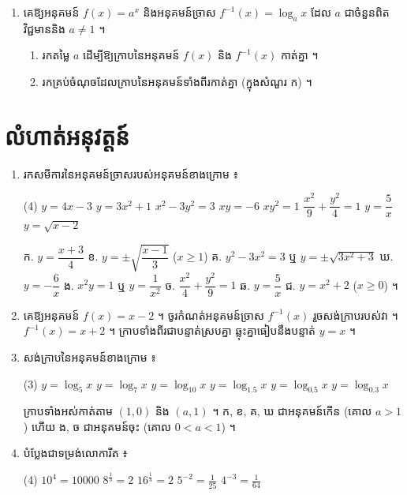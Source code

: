 \begin{enumerate}[1]
  \item គេឱ្យអនុគមន៍ $f(x) = a^x$ និងអនុគមន៍ច្រាស $f^{-1}(x) = \log_a x$ ដែល $a$ ជាចំនួនពិតវិជ្ជមាននិង $a \ne 1$ ។
  \begin{enumerate}[a]
    \item រកតម្លៃ $a$ ដើម្បីឱ្យក្រាបនៃអនុគមន៍ $f(x)$ និង $f^{-1}(x)$ កាត់គ្នា ។
    \item រកគ្រប់ចំណុចដែលក្រាបនៃអនុគមន៍ទាំងពីរកាត់គ្នា (ក្នុងសំណួរ ក) ។
  \end{enumerate}
\end{enumerate}

\section*{លំហាត់អនុវត្តន៍}
\begin{enumerate}[1]
  \item រកសមីការនៃអនុគមន៍ច្រាសរបស់អនុគមន៍ខាងក្រោម ៖
  \begin{tasks}(4)
    \task $y = 4x - 3$
    \task $y = 3x^2 + 1$
    \task $x^2 - 3y^2 = 3$
    \task $xy = -6$
    \task $xy^2 = 1$
    \task $\dfrac{x^2}{9} + \dfrac{y^2}{4} = 1$
    \task $y = \dfrac{5}{x}$
    \task $y = \sqrt{x - 2}$
  \end{tasks}
  \ans
  ក. $y = \dfrac{x + 3}{4}$ \quad ខ. $y = \pm\sqrt{\dfrac{x - 1}{3}}$ ($x \ge 1$) \quad គ. $y^2 - 3x^2 = 3$ ឬ $y = \pm\sqrt{3x^2 + 3}$ \quad ឃ. $y = -\dfrac{6}{x}$ \quad ង. $x^2y = 1$ ឬ $y = \dfrac{1}{x^2}$ \quad ច. $\dfrac{x^2}{4} + \dfrac{y^2}{9} = 1$ \quad ឆ. $y = \dfrac{5}{x}$ \quad ជ. $y = x^2 + 2$ ($x \ge 0$) ។
  \item គេឱ្យអនុគមន៍ $f(x) = x - 2$ ។ ចូរកំណត់អនុគមន៍ច្រាស $f^{-1}(x)$ រួចសង់ក្រាបរបស់វា ។
  \ans
  $f^{-1}(x) = x + 2$ ។ ក្រាបទាំងពីរជាបន្ទាត់ស្របគ្នា ឆ្លុះគ្នាធៀបនឹងបន្ទាត់ $y = x$ ។
  \item សង់ក្រាបនៃអនុគមន៍ខាងក្រោម ៖
  \begin{tasks}(3)
    \task $y = \log_5 x$
    \task $y = \log_7 x$
    \task $y = \log_{10} x$
    \task $y = \log_{1.5} x$
    \task $y = \log_{0.5} x$
    \task $y = \log_{0.3} x$
  \end{tasks}
  \ans
  ក្រាបទាំងអស់កាត់តាម $(1, 0)$ និង $(a, 1)$ ។ ក, ខ, គ, ឃ ជាអនុគមន៍កើន (គោល $a > 1$) ហើយ ង, ច ជាអនុគមន៍ចុះ (គោល $0 < a < 1$) ។
  \item បំប្លែងជាទម្រង់លោការីត ៖
  \begin{tasks}(4)
    \task $10^4 = 10000$
    \task $8^{\frac{1}{3}} = 2$
    \task $16^{\frac{1}{4}} = 2$
    \task $5^{-2} = \frac{1}{25}$
    \task $4^{-3} = \frac{1}{64}$

\end{tasks}
\end{enumerate}
